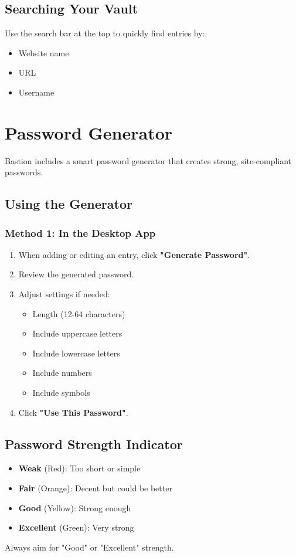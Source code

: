 \documentclass[11pt,a4paper]{article}
\begin{document}
\subsection{Searching Your Vault}
Use the search bar at the top to quickly find entries by:
\begin{itemize}
    \item Website name
    \item URL
    \item Username
\end{itemize}


\section{Password Generator}
Bastion includes a smart password generator that creates strong, site-compliant passwords.

\subsection{Using the Generator}

\subsubsection{Method 1: In the Desktop App}
\begin{enumerate}
    \item When adding or editing an entry, click \textbf{"Generate Password"}.
    \item Review the generated password.
    \item Adjust settings if needed:
    \begin{itemize}
        \item Length (12-64 characters)
        \item Include uppercase letters
        \item Include lowercase letters
        \item Include numbers
        \item Include symbols
    \end{itemize}
    \item Click \textbf{"Use This Password"}.
\end{enumerate}


\subsection{Password Strength Indicator}
\begin{itemize}
    \item \textbf{Weak} (Red): Too short or simple
    \item \textbf{Fair} (Orange): Decent but could be better
    \item \textbf{Good} (Yellow): Strong enough
    \item \textbf{Excellent} (Green): Very strong
\end{itemize}
Always aim for "Good" or "Excellent" strength.
\end{document}
